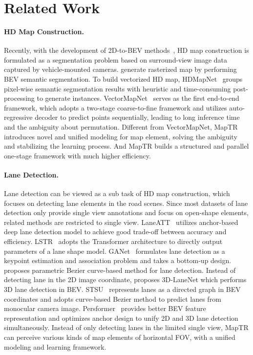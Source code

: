 \documentclass{article} \usepackage{iclr2023_conference,times}
\begin{document}
\section{Related Work}
\paragraph{HD Map Construction.}
Recently, with the development of 2D-to-BEV methods~\citep{Ma2022VisionCentricBP},
HD map construction is formulated as a segmentation problem based on  surround-view image data captured by vehicle-mounted cameras. \cite{gkt,cvt,fiery,bevformer,lss,polarbev} generate rasterized map by performing BEV semantic segmentation.
To build vectorized HD map, HDMapNet~\citep{hdmapnet}  groups pixel-wise semantic segmentation results with heuristic and time-consuming post-processing to generate instances. 
VectorMapNet~\citep{vectormapnet} serves as the first end-to-end framework, which adopts a two-stage coarse-to-fine framework and utilizes auto-regressive decoder to predict points sequentially, leading to long inference time and the ambiguity about permutation.
Different from VectorMapNet, MapTR introduces novel and unified modeling for map element, solving the ambiguity and stabilizing the learning process. And MapTR builds a structured and parallel one-stage framework with much higher efficiency. 




\paragraph{Lane Detection.}
Lane detection can be viewed as a sub task of HD map construction, which focuses on detecting lane elements in the road scenes. Since most datasets of lane detection only provide single view annotations and focus on open-shape elements, related methods are restricted to single view.
LaneATT~\citep{tabelini2021keep} utilizes anchor-based deep lane detection model to achieve good trade-off between accuracy and efficiency. LSTR~\citep{lstr} adopts the Transformer architecture to directly output parameters of a lane shape model. GANet~\citep{wang2022keypoint} formulates lane detection as a keypoint estimation and association problem and takes a bottom-up design.  \cite{feng2022rethinking} proposes parametric Bezier curve-based method for lane detection. Instead of detecting lane in the 2D image coordinate, \cite{garnett20193d} proposes 3D-LaneNet which performs 3D lane detection in BEV. STSU~\citep{can2021structured} represents lanes as a directed graph in BEV coordinates and adopts curve-based Bezier method to predict lanes from monocular camera image. Persformer~\citep{chen2022persformer} provides better BEV feature representation and optimizes anchor design to unify 2D and 3D lane detection simultaneously.
Instead of only detecting lanes in the limited single view,  MapTR can perceive various kinds of map elements of  horizontal FOV, with a unified modeling and learning framework.
\end{document}
